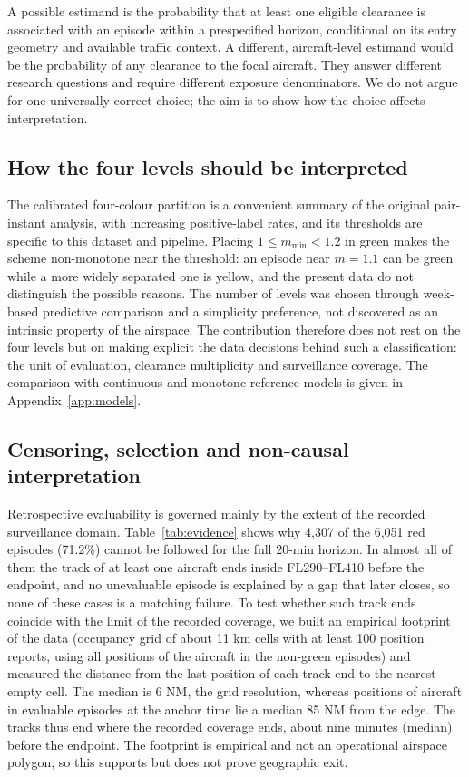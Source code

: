 \documentclass[aerospace,article,submit,moreauthors]{Definitions/mdpi}
\newcommand{\mmin}{m_{\min}}
\begin{document}
A possible estimand is the probability that at least one eligible clearance is associated with an episode within a prespecified horizon, conditional on its entry geometry and available traffic context. A different, aircraft-level estimand would be the probability of any clearance to the focal aircraft. They answer different research questions and require different exposure denominators. We do not argue for one universally correct choice; the aim is to show how the choice affects interpretation.

\subsection{How the four levels should be interpreted}
The calibrated four-colour partition is a convenient summary of the original pair-instant analysis, with increasing positive-label rates, and its thresholds are specific to this dataset and pipeline. Placing $1\le\mmin<1.2$ in green makes the scheme non-monotone near the threshold: an episode near $m=1.1$ can be green while a more widely separated one is yellow, and the present data do not distinguish the possible reasons. The number of levels was chosen through week-based predictive comparison and a simplicity preference, not discovered as an intrinsic property of the airspace. The contribution therefore does not rest on the four levels but on making explicit the data decisions behind such a classification: the unit of evaluation, clearance multiplicity and surveillance coverage. The comparison with continuous and monotone reference models is given in Appendix~\ref{app:models}.

\subsection{Censoring, selection and non-causal interpretation}\label{sec:limits}
Retrospective evaluability is governed mainly by the extent of the recorded surveillance domain. Table~\ref{tab:evidence} shows why 4,307 of the 6,051 red episodes (71.2\%) cannot be followed for the full 20-min horizon. In almost all of them the track of at least one aircraft ends inside FL290--FL410 before the endpoint, and no unevaluable episode is explained by a gap that later closes, so none of these cases is a matching failure. To test whether such track ends coincide with the limit of the recorded coverage, we built an empirical footprint of the data (occupancy grid of about 11 km cells with at least 100 position reports, using all positions of the aircraft in the non-green episodes) and measured the distance from the last position of each track end to the nearest empty cell. The median is 6 NM, the grid resolution, whereas positions of aircraft in evaluable episodes at the anchor time lie a median 85 NM from the edge. The tracks thus end where the recorded coverage ends, about nine minutes (median) before the endpoint. The footprint is empirical and not an operational airspace polygon, so this supports but does not prove geographic exit.
\end{document}
